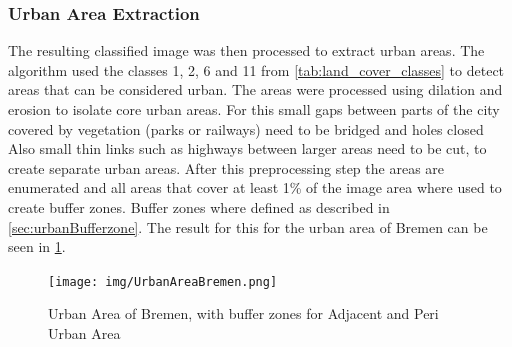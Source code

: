 \documentclass[12pt,a4paper, english,twoside]{scrartcl}
\begin{document}
    \subsubsection{Urban Area Extraction}\label{sec:urbanAreaExtraction}
      The resulting classified image was then processed to extract urban areas.
      The algorithm used the classes 1, 2, 6 and 11 from \cref{tab:land_cover_classes} to detect areas that can be considered urban.
      The areas were processed using \gls{dilation} and \gls{erosion} to isolate core urban areas. 
      For this small gaps between parts of the city covered by vegetation (parks or railways) need to be bridged and holes closed 
      Also small thin links such as highways between larger areas need to be cut, to create separate urban areas.
      After this preprocessing step the areas are enumerated and all areas that cover at least 1\% of the image area where used to create buffer zones. 
      Buffer zones where defined as described in \cref{sec:urbanBufferzone}. 
      The result for this for the urban area of Bremen can be seen in \cref{fig:bufferedBremen}.\\
      \begin{figure}
        \texttt{[image: img/UrbanAreaBremen.png]}
        \caption{Urban Area of Bremen, with buffer zones for Adjacent and Peri Urban Area\label{fig:bufferedBremen}}
      \end{figure}
\end{document}
